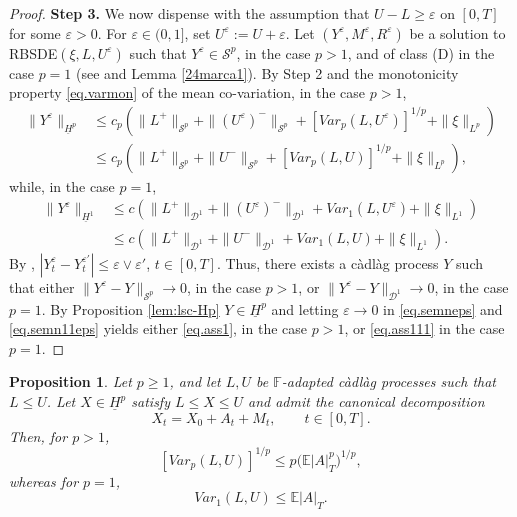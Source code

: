 \documentclass[11pt,a4paper,reqno]{amsart}
\newtheorem{proposition}[theorem]{\bf Proposition}
\theoremstyle{definition}
\numberwithin{equation}{section}
\begin{document}
\begin{proof}
{\bf Step 3.}  We now dispense with the assumption that $U-L\ge \varepsilon $ on $[0,T]$ for some $\varepsilon >0$.
For $\varepsilon\in (0,1]$, set $U^\varepsilon:= U+\varepsilon$.
Let  $(Y^\varepsilon,M^\varepsilon,R^\varepsilon)$ be a solution to RBSDE$(\xi,L,U^\varepsilon)$
such that $Y^\varepsilon\in\mathcal S^p$, in the case $p>1$, and of class (D) in the  case $p=1$
(see \cite[Proposition A.7, Remark A.8]{K:SPA2} and Lemma \ref{24marca1}).
By Step 2 and the monotonicity property \eqref{eq.varmon} of the mean co-variation, in the case  $p>1$,
\begin{equation}
\label{eq.semneps}
\begin{split}
\|Y^\varepsilon\|_{\underline H^p}
&\leq
c_p\left(\|L^+\|_{\mathcal S^p}+\|(U^\varepsilon)^-\|_{\mathcal S^p}+[Var_p(L,U^\varepsilon)]^{1/p}+\|\xi\|_{L^p}\right)
\\&\le c_p\left(\|L^+\|_{\mathcal S^p}+\|U^-\|_{\mathcal S^p}+[Var_p(L,U)]^{1/p}+\|\xi\|_{L^p}\right),
\end{split}
\end{equation}
while, in the case  $p=1$, 
\begin{equation}
\label{eq.semn11eps}
\begin{split}
\|Y^\varepsilon \|_{\underline H^1}
&\leq c\left(\|L^+\|_{\mathcal D^1}+\|(U^\varepsilon)^-\|_{\mathcal D^1}+Var_1(L,U^\varepsilon)+\|\xi\|_{L^1}\right)
\\&
\le c\left(\|L^+\|_{\mathcal D^1}+\|U^-\|_{\mathcal D^1}+Var_1(L,U)+\|\xi\|_{L^1}\right).
\end{split}
\end{equation}
By \cite[Theorem 3.14]{K:SPA2}, $|Y^\varepsilon_t-Y^{\varepsilon'}_t|\le \varepsilon\vee\varepsilon'$, $t\in [0,T]$.
Thus, there exists a c\`adl\`ag process $Y$ such that either
$\|Y^\varepsilon -Y\|_{\mathcal S^p}\to 0$, in the case $p>1$, or $\|Y^\varepsilon -Y \|_{\mathcal D^1}\to 0$,
 in the case $p=1$.  By Proposition \ref{lem:lsc-Hp} $Y\in \underline{H}^p$ and  letting   $\varepsilon \to 0$
 in \eqref{eq.semneps} and \eqref{eq.semn11eps} yields  either \eqref{eq.ass1}, in the case $p>1$, or 
\eqref{eq.ass111}  in the case $p=1$.
\end{proof}



\begin{proposition}\label{prop.var.lower}
Let $p\geq1$, and let $L,U$ be $\mathbb F$-adapted c\`adl\`ag processes such that
$L\leq U$. Let $X\in \underline H^p$ satisfy   $L\le X\le U$ and  admit  the canonical decomposition 
\[
X_t=X_0+A_t+M_t,\qquad t\in[0,T].
\]
Then, for $p>1$,
\begin{equation}\label{eq.var.lower.p}
[Var_p(L,U)]^{1/p}
\leq
p\big(\mathbb E|A|_T^p\big)^{1/p},
\end{equation}
whereas for $p=1$,
\begin{equation}\label{eq.var.lower.1}
Var_1(L,U)\leq \mathbb E|A|_T.
\end{equation}
\end{proposition}
\end{document}
